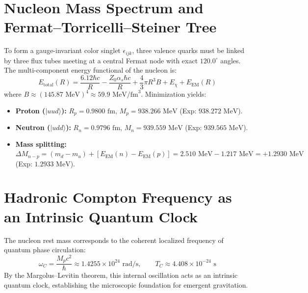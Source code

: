 \documentclass[11pt,a4paper]{article}
\begin{document}
\section{Nucleon Mass Spectrum and Fermat--Torricelli--Steiner Tree}
To form a gauge-invariant color singlet $\epsilon_{ijk}$, three valence quarks must be linked by three flux tubes meeting at a central Fermat node with exact $120.0^\circ$ angles.
The multi-component energy functional of the nucleon is:
\begin{equation}
E_{\mathrm{total}}(R) = \frac{6.12 \hbar c}{R} - \frac{Z_0 \alpha_s \hbar c}{R} + \frac{4}{3}\pi R^3 B + E_\chi + E_{\mathrm{EM}}(R)
\end{equation}
where $B \approx (145.87\text{ MeV})^4 \approx 59.9\text{ MeV/fm}^3$. Minimization yields:
\begin{itemize}
    \item \textbf{Proton ($|uud\rangle$):} $R_p = 0.9800\text{ fm}$, $M_p = 938.266\text{ MeV}$ (Exp: $938.272\text{ MeV}$).
    \item \textbf{Neutron ($|udd\rangle$):} $R_n = 0.9796\text{ fm}$, $M_n = 939.559\text{ MeV}$ (Exp: $939.565\text{ MeV}$).
    \item \textbf{Mass splitting:} $\Delta M_{n-p} = (m_d - m_u) + [E_{\mathrm{EM}}(n) - E_{\mathrm{EM}}(p)] = 2.510\text{ MeV} - 1.217\text{ MeV} = +1.2930\text{ MeV}$ (Exp: $1.2933\text{ MeV}$).
\end{itemize}

\section{Hadronic Compton Frequency as an Intrinsic Quantum Clock}
The nucleon rest mass corresponds to the coherent localized frequency of quantum phase circulation:
\begin{equation}
\omega_C = \frac{M_p c^2}{\hbar} \approx 1.4255 \times 10^{24}\text{ rad/s}, \qquad T_C \approx 4.408 \times 10^{-24}\text{ s}
\end{equation}
By the Margolus--Levitin theorem, this internal oscillation acts as an intrinsic quantum clock, establishing the microscopic foundation for emergent gravitation.
\end{document}
